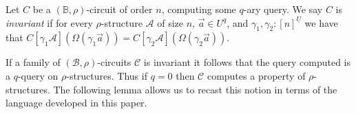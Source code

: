 \documentclass[../paper.tex]{subfiles}
\begin{document}
\begin{definition}
  Let $C$ be a $(\mathbb{B}, \rho)$-circuit of order $n$, computing some $q$-ary
  query. We say $C$ is \emph{invariant} if for every $\rho$-structure
  $\mathcal{A}$ of size $n$, $\vec{a} \in U^{q}$, and $\gamma_1, \gamma_2:
  [n]^{\underline{U}}$ we have that $C[\gamma_1 \mathcal{A}](\Omega (\gamma_1
  \vec{a})) = C[\gamma_2 \mathcal{A}](\Omega (\gamma_2 \vec{a}))$.
\end{definition}

If a family of $(\mathcal{B}, \rho)$-circuits $\mathcal{C}$ is invariant it
follows that the query computed is a $q$-query on $\rho$-structures. Thus if $q
= 0$ then $\mathcal{C}$ computes a property of $\rho$-structures. The following
lemma allows us to recast this notion in terms of the language developed in this
paper.
\end{document}
